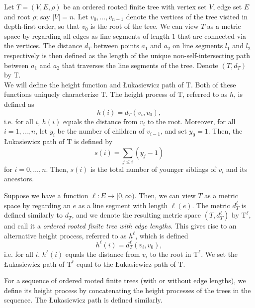 Let $T=(V,E,\rho)$ be an ordered rooted finite tree with vertex set $V$, edge set $E$ and root $\rho$; say $|V|=n$. Let $v_0,\dots,v_{n-1}$ denote the vertices of the tree visited in depth-first order, so that $v_0$ is the root of the tree. We can view $T$ as a metric space by regarding all edges as line segments of length $1$ that are connected via the vertices. The distance $d_T$ between points $a_1$ and $a_2$ on line segments $l_1$ and $l_2$ respectively is then defined as the length of the unique non-self-intersecting path between $a_1$ and $a_2$ that traverses the line segments of the tree. Denote $(T,d_T)$ by $\mathrm{T}$.\\
We will define the height function and \L ukasiewicz path of $\mathrm{T}$. Both of these functions uniquely characterize $\mathrm{T}$. The height process of $\mathrm{T}$, referred to as $h$, is defined as $$h(i)=d_T(v_i,v_0),$$ i.e.  for all $i$, $h(i)$ equals the distance from $v_i$ to the root.
Moreover, for all $i=1,\dots,n$, let $y_i$ be the number of children of $v_{i-1}$, and set $y_0=1$. Then, the \L ukasiewicz path of $\mathrm{T}$ is defined by $$s(i)=\sum\limits_{j\leq i} (y_j-1)$$ for $i=0,\dots,n$. Then, $s(i)$ is the total number of younger siblings of $v_i$ and its ancestors.

Suppose we have a function $\ell:E\to [0,\infty)$. Then, we can view $T$ as a metric space by regarding an $e$ as a line segment with length $\ell(e)$. The metric $d_T^\ell$ is defined similarly to $d_T$, and we denote the resulting metric space $(T,d^\ell_T)$ by $\mathrm{T}^\ell$, and call it a \emph{ordered rooted finite tree with edge lengths}. This gives rise to an alternative height process, referred to as $h^\ell$, which is defined $$h^\ell(i)=d^\ell_T(v_i,v_0),$$ i.e.  for all $i$, $h^\ell(i)$ equals the distance from $v_i$ to the root in $\mathrm{T}^\ell$. We set the \L ukasiewicz path of $\mathrm{T}^\ell$ equal to the \L ukasiewicz path of $\mathrm{T}$.

For a sequence of ordered rooted finite trees (with or without edge lengths), we define its height process by concatenating the height processes of the trees in the sequence. The \L ukasiewicz path is defined similarly. 